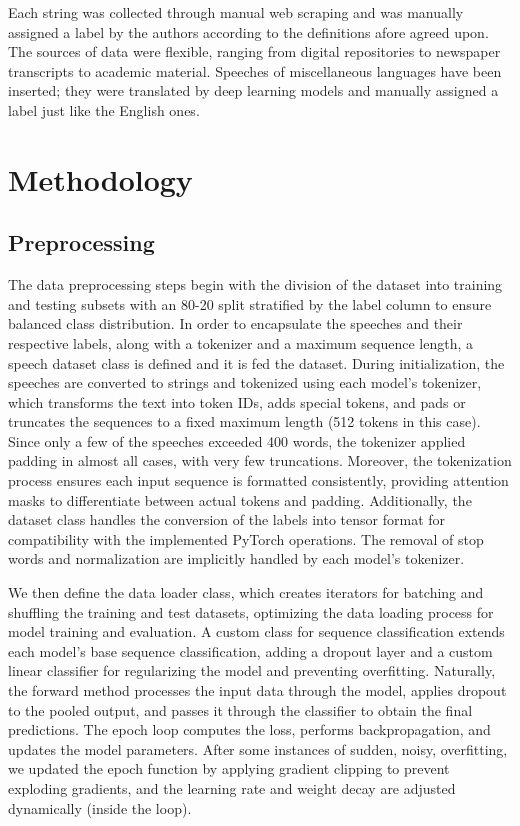 \documentclass[11pt,twocolumn,letterpaper]{article}
\begin{document}
Each string was collected through manual web scraping and was manually assigned a label by the authors according to the definitions afore agreed upon. The sources of data were flexible, ranging from digital repositories to newspaper transcripts to academic material. Speeches of miscellaneous languages have been inserted; they were translated by deep learning models and manually assigned a label just like the English ones.


\section{Methodology}

\subsection{Preprocessing}

The data preprocessing steps begin with the division of the dataset into training and testing subsets with an 80-20 split stratified by the label column to ensure balanced class distribution. In order to encapsulate the speeches and their respective labels, along with a tokenizer and a maximum sequence length, a speech dataset class is defined and it is fed the dataset. During initialization, the speeches are converted to strings and tokenized using each model's tokenizer, which transforms the text into token IDs, adds special tokens, and pads or truncates the sequences to a fixed maximum length (512 tokens in this case). Since only a few of the speeches exceeded 400 words, the tokenizer applied padding in almost all cases, with very few truncations. Moreover, the tokenization process ensures each input sequence is formatted consistently, providing attention masks to differentiate between actual tokens and padding. Additionally, the dataset class handles the conversion of the labels into tensor format for compatibility with the implemented PyTorch operations. The removal of stop words and normalization are implicitly handled by each model's tokenizer.

We then define the data loader class, which creates iterators for batching and shuffling the training and test datasets, optimizing the data loading process for model training and evaluation. A custom class for sequence classification extends each model's base sequence classification, adding a dropout layer and a custom linear classifier for regularizing the model and preventing overfitting. Naturally, the forward method processes the input data through the model, applies dropout to the pooled output, and passes it through the classifier to obtain the final predictions. The epoch loop computes the loss, performs backpropagation, and updates the model parameters. After some instances of sudden, noisy, overfitting, we updated the epoch function by applying gradient clipping to prevent exploding gradients, and the learning rate and weight decay are adjusted dynamically (inside the loop).
\end{document}
